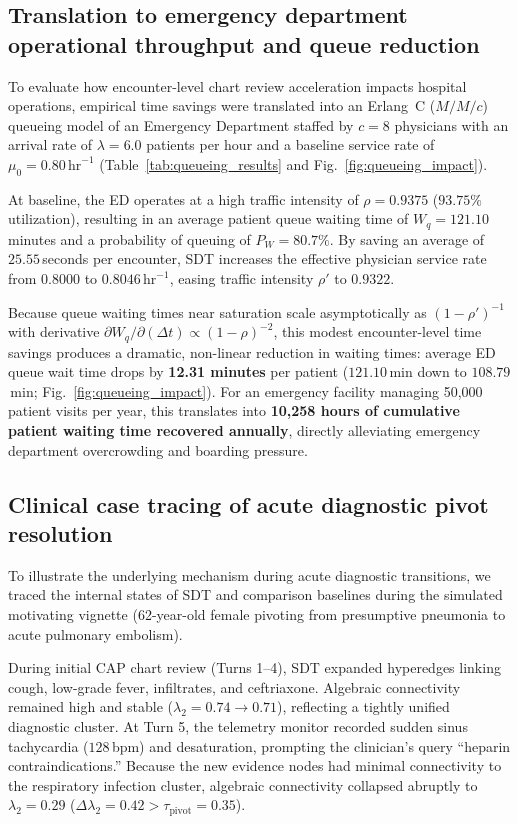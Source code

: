 \documentclass[12pt]{article}
\begin{document}
\subsection*{Translation to emergency department operational throughput and queue reduction}

To evaluate how encounter-level chart review acceleration impacts hospital operations, empirical time savings were translated into an Erlang~C ($M/M/c$) queueing model of an Emergency Department staffed by $c=8$ physicians with an arrival rate of $\lambda = 6.0$ patients per hour and a baseline service rate of $\mu_0 = 0.80\,\text{hr}^{-1}$ (Table~\ref{tab:queueing_results} and Fig.~\ref{fig:queueing_impact}).

At baseline, the ED operates at a high traffic intensity of $\rho = 0.9375$ ($93.75\%$ utilization), resulting in an average patient queue waiting time of $W_q = 121.10$\,minutes and a probability of queuing of $P_W = 80.7\%$. By saving an average of $25.55$\,seconds per encounter, SDT increases the effective physician service rate from $0.8000$ to $0.8046\,\text{hr}^{-1}$, easing traffic intensity $\rho'$ to $0.9322$.

Because queue waiting times near saturation scale asymptotically as $(1-\rho')^{-1}$ with derivative $\partial W_q / \partial(\Delta t) \propto (1-\rho)^{-2}$, this modest encounter-level time savings produces a dramatic, non-linear reduction in waiting times: average ED queue wait time drops by \textbf{12.31 minutes} per patient ($121.10$\,min down to $108.79$\,min; Fig.~\ref{fig:queueing_impact}). For an emergency facility managing 50,000 patient visits per year, this translates into \textbf{10,258 hours of cumulative patient waiting time recovered annually}, directly alleviating emergency department overcrowding and boarding pressure.

\subsection*{Clinical case tracing of acute diagnostic pivot resolution}

To illustrate the underlying mechanism during acute diagnostic transitions, we traced the internal states of SDT and comparison baselines during the simulated motivating vignette (62-year-old female pivoting from presumptive pneumonia to acute pulmonary embolism).

During initial CAP chart review (Turns 1--4), SDT expanded hyperedges linking cough, low-grade fever, infiltrates, and ceftriaxone. Algebraic connectivity remained high and stable ($\lambda_2 = 0.74 \to 0.71$), reflecting a tightly unified diagnostic cluster. At Turn 5, the telemetry monitor recorded sudden sinus tachycardia ($128$\,bpm) and desaturation, prompting the clinician's query ``heparin contraindications.'' Because the new evidence nodes had minimal connectivity to the respiratory infection cluster, algebraic connectivity collapsed abruptly to $\lambda_2 = 0.29$ ($\Delta \lambda_2 = 0.42 > \tau_{\text{pivot}} = 0.35$).
\end{document}
